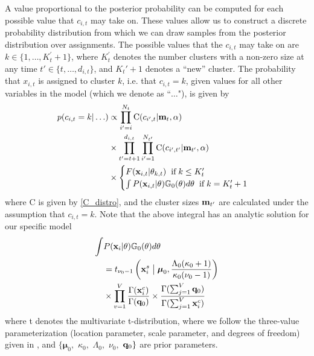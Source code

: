 \documentclass[twocolumn, final]{svjour3}
\begin{document}
A value proportional to the posterior probability can be computed for each possible value that $c_{i,t}$ may take on. These values allow us to construct a discrete probability distribution from which we can draw samples from the posterior distribution over assignments. The possible values that the $c_{i,t}$ may take on are $k \in \{ 1 , \ldots ,  K_{t}^{'}+1 \}$, where $K_{t}^{'}$ denotes the number clusters with a non-zero size at any time $t' \in \{ t, \ldots, d_{i,t} \}$, and $K_{t}'+1$ denotes a ``new'' cluster. The probability that $x_{i,t}$ is assigned to cluster $k$, i.e. that $c_{i,t}=k$, given values for all other variables in the model (which we denote as ``$\ldots$"), is given by
\begin{equation}
\label{mcmc_assig_vars}
\begin{split}
p(c_{i,t} = k | \ldots ) & \propto
\prod_{i'=i}^{N_{t}}  \text{C}(c_{i',t} | \bold{m}_{t}, \alpha) \\
& \times \prod_{t' = t+1}^{d_{i,t}}  \prod_{i'=1}^{N_{t'}}   \text{C}(c_{i',t'} | \bold{m}_{t'}, \alpha) \\
 & \times
\begin{cases}
  F(\bold{x}_{i,t} | \theta_{k,t}) \hspace{2mm} \text{if} \hspace{1mm} k \leq K_{t}' \\ %
  \int P(\bold{x}_{i,t} | \theta) \mathbb{G}_{0}(\theta) d\theta \hspace{2mm} \text{if} \hspace{1mm}  k = K_{t}'+1
\end{cases}
\end{split}
\end{equation}
where C is given by \eqref{C_distro}, and the cluster sizes $\bold{m}_{t'}$ are calculated under the assumption that $c_{i,t} = k$. Note that the above integral has an analytic solution for our specific model
\begin{equation}
\begin{split}
\label{marginal_obs_prob}
\int & P(\bold{x}_{i} | \theta) \mathbb{G}_{0}(\theta)d\theta \\
&= t_{\nu_{0} - 1}  \left ( \bold{x}_{i}^{s}  \hspace{1mm} \big{|} \hspace{1mm} \boldsymbol{\mu}_{0}, \frac{\Lambda_{0}(\kappa_{0}+1)}{\kappa_{0}(\nu_{0}-1)} \right ) \\
& \times \prod_{v=1}^{V} \frac{ \Gamma(\bold{x}_{i}^{c}) }  { \Gamma(\bold{q}_{0})}
\times \frac{\Gamma(\sum_{j=1}^{V} \bold{q}_{0}) }{\Gamma(\sum_{j=1}^{V} \bold{x}_{i}^{c}) }
\end{split}
\end{equation}
where t denotes the multivariate t-distribution, where we follow the three-value parameterization (location parameter, scale parameter, and degrees of freedom) given in \cite{gelman2004bayesian, Wood2008nonparametric}, and $\{ \boldsymbol{\mu}_{0},$ $\kappa_{0},$ $\Lambda_{0},$ $\nu_{0},$ $\bold{q}_{0} \}$ are prior parameters.
\end{document}
